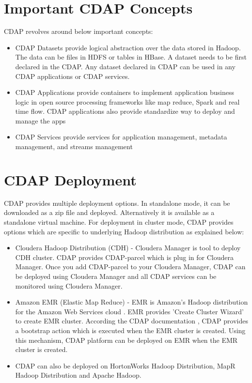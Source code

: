 \documentclass[9pt,twocolumn,twoside]{styles/osajnl}
\begin{document}
\section{Important CDAP Concepts}
CDAP revolves around below important concepts:
\begin{itemize}
\item CDAP Datasets provide logical abstraction over the data stored in
Hadoop. The data can be files in HDFS or tables in HBase. A dataset needs to
be first declared in the CDAP. Any dataset declared in CDAP can be used in
any CDAP applications or CDAP services.
\item CDAP Applications provide containers to implement application business
logic in open source processing frameworks like map reduce, Spark and real
time flow. CDAP applications also provide standardize way to deploy and
manage the apps
\item CDAP Services provide services for application management, metadata
management, and streams management
\end{itemize}

\section{CDAP Deployment}
CDAP provides multiple deployment options. In standalone mode, it can be
downloaded as a zip file and deployed.
Alternatively it is available as a standalone virtual machine.
For deployment in cluster mode, CDAP provides options which are specific to
underlying Hadoop distribution as explained below:
\begin{itemize}
\item Cloudera Hadoop Distribution (CDH) - Cloudera Manager
\cite{www-cdh-manager} is tool to deploy CDH cluster. CDAP provides
CDAP-parcel \cite{www-cdap-cloudera-manager} which is plug in for
Cloudera Manager. Once you add CDAP-parcel to your Cloudera Manager, CDAP can
 be deployed using Cloudera Manager and all CDAP services can be monitored
 using Cloudera Manager.
\item Amazon EMR (Elastic Map Reduce) - EMR is Amazon's Hadoop distribution
for the Amazon Web Services cloud \cite{www-amazon-emr}.  EMR provides
'Create Cluster Wizard' to create EMR cluster. According the CDAP
documentation \cite{www-cdap-emr}, CDAP provides a bootstrap action which is
executed when the EMR cluster is created. Using this mechanism, CDAP platform
 can be deployed on EMR when the EMR cluster is created.
\item
CDAP can also be deployed on HortonWorks Hadoop Distribution, MapR Hadoop
Distribution and Apache Hadoop.
\end{itemize}
\end{document}
